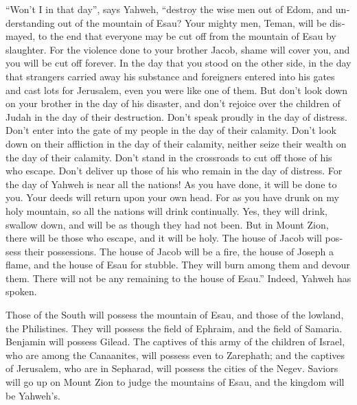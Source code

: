 \begin{paracol}{2}
\begin{otherlanguage}{english}
 ``Won't I in that day'', says Yahweh, ``destroy the wise
men out of Edom, and understanding out of the mountain of Esau?
 Your mighty men, Teman, will be dismayed, to the end that
everyone may be cut off from the mountain of Esau by slaughter.
 For the violence done to your brother Jacob, shame will
cover you, and you will be cut off forever.  In the day
that you stood on the other side, in the day that strangers carried away
his substance and foreigners entered into his gates and cast lots for
Jerusalem, even you were like one of them.  But don't
look down on your brother in the day of his disaster, and don't rejoice
over the children of Judah in the day of their destruction. Don't speak
proudly in the day of distress.  Don't enter into the
gate of my people in the day of their calamity. Don't look down on their
affliction in the day of their calamity, neither seize their wealth on
the day of their calamity.  Don't stand in the crossroads
to cut off those of his who escape. Don't deliver up those of his who
remain in the day of distress.  For the day of Yahweh is
near all the nations! As you have done, it will be done to you. Your
deeds will return upon your own head.  For as you have
drunk on my holy mountain, so all the nations will drink continually.
Yes, they will drink, swallow down, and will be as though they had not
been.  But in Mount Zion, there will be those who escape,
and it will be holy. The house of Jacob will possess their possessions.
 The house of Jacob will be a fire, the house of Joseph a
flame, and the house of Esau for stubble. They will burn among them and
devour them. There will not be any remaining to the house of Esau.''
Indeed, Yahweh has spoken.

 Those of the South will possess the mountain of Esau,
and those of the lowland, the Philistines. They will possess the field
of Ephraim, and the field of Samaria. Benjamin will possess Gilead.
 The captives of this army of the children of Israel, who
are among the Canaanites, will possess even to Zarephath; and the
captives of Jerusalem, who are in Sepharad, will possess the cities of
the Negev.  Saviors will go up on Mount Zion to judge the
mountains of Esau, and the kingdom will be Yahweh's.
\end{otherlanguage} \end{paracol}
